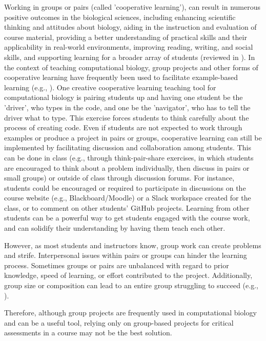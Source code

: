 Working in groups or pairs (called 'cooperative learning'), can result in numerous positive outcomes in the biological sciences, including enhancing scientific thinking and attitudes about biology, aiding in the instruction and evaluation of course material, providing a better understanding of practical skills and their applicability in real-world environments, improving reading, writing, and social skills, and supporting learning for a broader array of students (reviewed in \cite{lord_101_2001}). 
In the context of teaching computational biology, group projects and other forms of cooperative learning have frequently been used to facilitate example-based learning (e.g., \cite{emery_application_2017,korcsmaros_teaching_2013,fuselier_trace_2011}).
One creative cooperative learning teaching tool for computational biology is pairing students up and having one student be the 'driver', who types in the code, and one be the 'navigator', who has to tell the driver what to type. 
This exercise forces students to think carefully about the process of creating code.
Even if students are not expected to work through examples or produce a project in pairs or groups, cooperative learning can still be implemented by facilitating discussion and collaboration among students.
This can be done in class (e.g., through think-pair-share exercises, in which students are encouraged to think about a problem individually, then discuss in pairs or small groups) or outside of class through discussion forums.
For instance, students could be encouraged or required to participate in discussions on the course website (e.g., Blackboard/Moodle) or a Slack workspace created for the class, or to comment on other students' GitHub projects.
Learning from other students can be a powerful way to get students engaged with the course work, and can solidify their understanding by having them teach each other. 

However, as most students and instructors know, group work can create problems and strife.
Interpersonal issues within pairs or groups can hinder the learning process.
Sometimes groups or pairs are unbalanced with regard to prior knowledge, speed of learning, or effort contributed to the project.
Additionally, group size or composition can lead to an entire group struggling to succeed (e.g., \citep{compeau_establishing_2019}). 

Therefore, although group projects are frequently used in computational biology and can be a useful tool, relying only on group-based projects for critical assessments in a course may not be the best solution.

